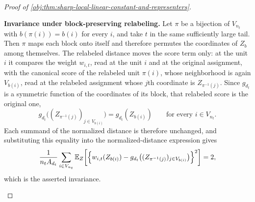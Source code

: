 \documentclass[11pt]{article}
\begin{document}
\begin{proof}[Proof of \cref{obj:thm:sharp-local-linear-constant-and-representers}]
\begin{enumerate}
\textbf{Invariance under block-preserving relabeling.}  Let \(\pi\) be a bijection of \(V_{n_t}\) with \(b(\pi(i))=b(i)\) for every \(i\), and take \(t\) in the same sufficiently large tail.  Then \(\pi\) maps each block onto itself and therefore permutes the coordinates of \(Z_b\) among themselves.  The relabeled distance moves the score term only: at the unit \(i\) it compares the weight \(w_{i,t}\), read at the unit \(i\) and at the original assignment, with the canonical score of the relabeled unit \(\pi(i)\), whose neighborhood is again \(V_{b(i)}\), read at the relabeled assignment whose \(j\)th coordinate is \(Z_{\pi^{-1}(j)}\).  Since \(g_{d_t}\) is a symmetric function of the coordinates of its block, that relabeled score is the original one,
\[
g_{d_t}\bigl((Z_{\pi^{-1}(j)})_{j\in V_{b(i)}}\bigr)
=
g_{d_t}(Z_{b(i)})
\qquad\text{for every }i\in V_{n_t}.
\]
Each summand of the normalized distance is therefore unchanged, and substituting this equality into the normalized-distance expression gives
\[
\frac{1}{n_tA_{d_t}}
\sum_{i\in V_{n_t}}
\mathbb E_Z\!\left[
\Bigl\{w_{i,t}(Z_{b(i)})-g_{d_t}\bigl((Z_{\pi^{-1}(j)})_{j\in V_{b(i)}}\bigr)\Bigr\}^2
\right]
=2 ,
\]
which is the asserted invariance.
\end{enumerate}
\end{proof}
\end{document}
